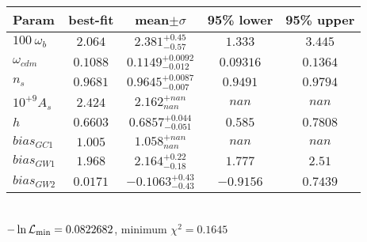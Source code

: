 \begin{tabular}{|l|c|c|c|c|} 
 \hline 
Param & best-fit & mean$\pm\sigma$ & 95\% lower & 95\% upper \\ \hline 
$100~\omega_{b }$ &$2.064$ & $2.381_{-0.57}^{+0.45}$ & $1.333$ & $3.445$ \\ 
$\omega_{cdm }$ &$0.1088$ & $0.1149_{-0.012}^{+0.0092}$ & $0.09316$ & $0.1364$ \\ 
$n_{s }$ &$0.9681$ & $0.9645_{-0.007}^{+0.0087}$ & $0.9491$ & $0.9794$ \\ 
$10^{+9}A_{s }$ &$2.424$ & $2.162_{nan}^{+nan}$ & $nan$ & $nan$ \\ 
$h$ &$0.6603$ & $0.6857_{-0.051}^{+0.044}$ & $0.585$ & $0.7808$ \\ 
$bias_{GC 1 }$ &$1.005$ & $1.058_{nan}^{+nan}$ & $nan$ & $nan$ \\ 
$bias_{GW 1 }$ &$1.968$ & $2.164_{-0.18}^{+0.22}$ & $1.777$ & $2.51$ \\ 
$bias_{GW 2 }$ &$0.0171$ & $-0.1063_{-0.43}^{+0.43}$ & $-0.9156$ & $0.7439$ \\ 
\hline 
 \end{tabular} \\ 
$-\ln{\cal L}_\mathrm{min} =0.0822682$, minimum $\chi^2=0.1645$ \\ 
